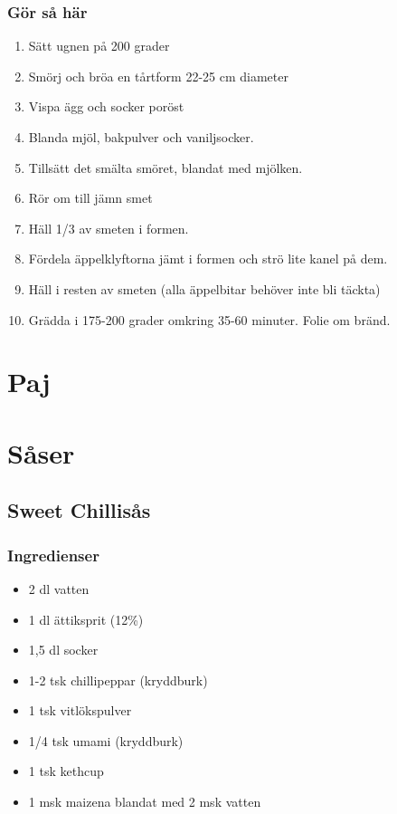 \documentclass[a4paper,11pt,twocolumn]{article}
\begin{document}
\subsubsection*{Gör så här}
\begin{enumerate}[label=\arabic*.]
    \item Sätt ugnen på 200 grader
    \item Smörj och bröa en tårtform 22-25 cm diameter
    \item Vispa ägg och socker poröst
    \item Blanda mjöl, bakpulver och vaniljsocker.
    \item Tillsätt det smälta smöret, blandat med mjölken.
    \item Rör om till jämn smet
    \item Häll 1/3 av smeten i formen.
    \item Fördela äppelklyftorna jämt i formen och strö lite kanel på dem.
    \item Häll i resten av smeten (alla äppelbitar behöver inte bli täckta)
    \item Grädda i 175-200 grader omkring 35-60 minuter. Folie om bränd.
\end{enumerate}




\newpage
\section{Paj}




\newpage
\section{Såser}



\subsection{Sweet Chillisås}
\subsubsection*{Ingredienser}
\begin{itemize}[noitemsep]
    \item 2 dl vatten
    \item 1 dl ättiksprit (12\%)
    \item 1,5 dl socker
    \item 1-2 tsk chillipeppar (kryddburk)
    \item 1 tsk vitlökspulver
    \item 1/4 tsk umami (kryddburk)
    \item 1 tsk kethcup
    \item 1 msk maizena blandat med 2 msk vatten
\end{itemize}
\end{document}
